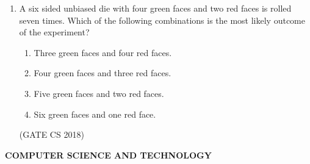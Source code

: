\documentclass[12pt]{article}
\begin{document}
\begin{enumerate}
\item A six sided unbiased die with four green faces and two red faces is rolled seven times.
Which of the following combinations is the most likely outcome of the experiment?

\begin{enumerate}
\item Three green faces and four red faces.
\item Four green faces and three red faces.
\item Five green faces and two red faces.
\item Six green faces and one red face.
\end{enumerate}
(GATE CS 2018)


\end{enumerate}

\newpage

\begin{center}
    {\Large \textbf{COMPUTER SCIENCE AND TECHNOLOGY}}
\end{center}
\end{document}
